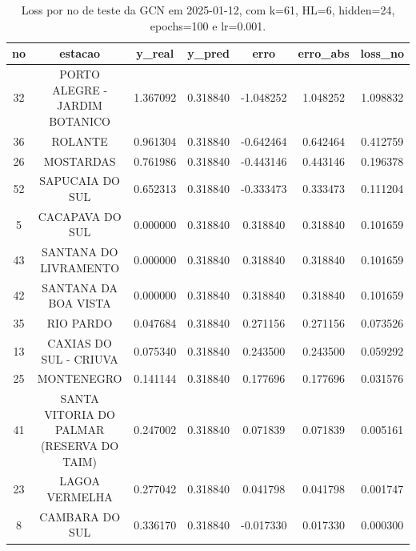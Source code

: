\begin{table}[h]
\centering
\caption{Loss por no de teste da GCN em 2025-01-12, com k=61, HL=6, hidden=24, epochs=100 e lr=0.001.}
\label{tab:gcn_loss_k61_hl6_h24_e100_d20250112}
\begin{tabular}{ccccccc}
\toprule
no & estacao & y\_real & y\_pred & erro & erro\_abs & loss\_no \\
\midrule
32 & PORTO ALEGRE - JARDIM BOTANICO & 1.367092 & 0.318840 & -1.048252 & 1.048252 & 1.098832 \\
36 & ROLANTE & 0.961304 & 0.318840 & -0.642464 & 0.642464 & 0.412759 \\
26 & MOSTARDAS & 0.761986 & 0.318840 & -0.443146 & 0.443146 & 0.196378 \\
52 & SAPUCAIA DO SUL & 0.652313 & 0.318840 & -0.333473 & 0.333473 & 0.111204 \\
5 & CACAPAVA DO SUL & 0.000000 & 0.318840 & 0.318840 & 0.318840 & 0.101659 \\
43 & SANTANA DO LIVRAMENTO & 0.000000 & 0.318840 & 0.318840 & 0.318840 & 0.101659 \\
42 & SANTANA DA BOA VISTA & 0.000000 & 0.318840 & 0.318840 & 0.318840 & 0.101659 \\
35 & RIO PARDO & 0.047684 & 0.318840 & 0.271156 & 0.271156 & 0.073526 \\
13 & CAXIAS DO SUL - CRIUVA & 0.075340 & 0.318840 & 0.243500 & 0.243500 & 0.059292 \\
25 & MONTENEGRO & 0.141144 & 0.318840 & 0.177696 & 0.177696 & 0.031576 \\
41 & SANTA VITORIA DO PALMAR (RESERVA DO TAIM) & 0.247002 & 0.318840 & 0.071839 & 0.071839 & 0.005161 \\
23 & LAGOA VERMELHA & 0.277042 & 0.318840 & 0.041798 & 0.041798 & 0.001747 \\
8 & CAMBARA DO SUL & 0.336170 & 0.318840 & -0.017330 & 0.017330 & 0.000300 \\
\bottomrule
\end{tabular}
\end{table}
